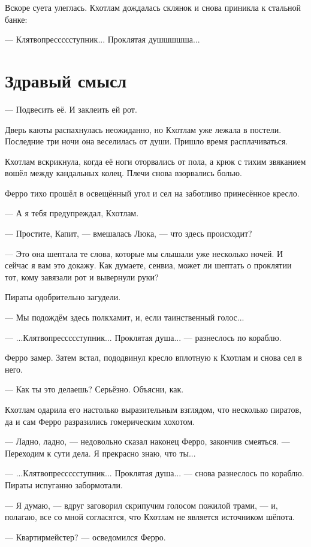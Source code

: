 Вскоре суета улеглась.
Кхотлам дождалась склянок и снова приникла к стальной банке:

--- Клятвопрессссступник...
Проклятая душшшшша...

\section{Здравый смысл}

--- Подвесить её.
И заклеить ей рот.

Дверь каюты распахнулась неожиданно, но Кхотлам уже лежала в постели.
Последние три ночи она веселилась от души.
Пришло время расплачиваться.

Кхотлам вскрикнула, когда её ноги оторвались от пола, а крюк с тихим звяканием вошёл между кандальных колец.
Плечи снова взорвались болью.

Ферро тихо прошёл в освещённый угол и сел на заботливо принесённое кресло.

--- А я тебя предупреждал, Кхотлам.

--- Простите, Капит, --- вмешалась Люка, --- что здесь происходит?

--- Это она шептала те слова, которые мы слышали уже несколько ночей.
И сейчас я вам это докажу.
Как думаете, сенвиа, может ли шептать о проклятии тот, кому завязали рот и вывернули руки?

Пираты одобрительно загудели.

--- Мы подождём здесь полкхамит, и, если таинственный голос...

--- ...Клятвопрессссступник... Проклятая душа... --- разнеслось по кораблю.

Ферро замер.
Затем встал, пододвинул кресло вплотную к Кхотлам и снова сел в него.

--- Как ты это делаешь?
Серьёзно.
Объясни, как.

Кхотлам одарила его настолько выразительным взглядом, что несколько пиратов, да и сам Ферро разразились гомерическим хохотом.

--- Ладно, ладно, --- недовольно сказал наконец Ферро, закончив смеяться.
--- Переходим к сути дела.
Я прекрасно знаю, что ты...

--- ...Клятвопрессссступник... Проклятая душа... --- снова разнеслось по кораблю.
Пираты испуганно забормотали.

--- Я думаю, --- вдруг заговорил скрипучим голосом пожилой трами, --- и, полагаю, все со мной согласятся, что Кхотлам не является источником шёпота.

--- Квартирмейстер? --- осведомился Ферро.

